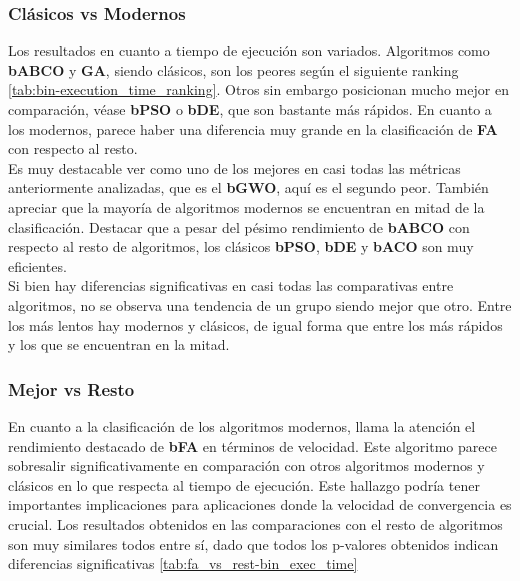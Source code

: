 \subsubsection{Clásicos vs Modernos}
Los resultados en cuanto a tiempo de ejecución son variados. Algoritmos como \textbf{bABCO} y \textbf{GA}, siendo clásicos, son los peores según el siguiente ranking \ref{tab:bin-execution_time_ranking}. Otros sin embargo posicionan mucho mejor en comparación, véase \textbf{bPSO} o \textbf{bDE}, que son bastante más rápidos. En cuanto a los modernos, parece haber una diferencia muy grande en la clasificación de \textbf{FA} con respecto al resto.\\[6pt]
Es muy destacable ver como uno de los mejores en casi todas las métricas anteriormente analizadas, que es el \textbf{bGWO}, aquí es el segundo peor. También apreciar que la mayoría de algoritmos modernos se encuentran en mitad de la clasificación. Destacar que a pesar del pésimo rendimiento de \textbf{bABCO} con respecto al resto de algoritmos, los clásicos \textbf{bPSO}, \textbf{bDE} y \textbf{bACO} son muy eficientes.\\[6pt]
Si bien hay diferencias significativas en casi todas las comparativas entre algoritmos, no se observa una tendencia de un grupo siendo mejor que otro. Entre los más lentos hay modernos y clásicos, de igual forma que entre los más rápidos y los que se encuentran en la mitad.

\subsubsection{Mejor vs Resto}
En cuanto a la clasificación de los algoritmos modernos, llama la atención el rendimiento destacado de \textbf{bFA} en términos de velocidad. Este algoritmo parece sobresalir significativamente en comparación con otros algoritmos modernos y clásicos en lo que respecta al tiempo de ejecución. Este hallazgo podría tener importantes implicaciones para aplicaciones donde la velocidad de convergencia es crucial. Los resultados obtenidos en las comparaciones con el resto de algoritmos son muy similares todos entre sí, dado que todos los p-valores obtenidos indican diferencias significativas \ref{tab:fa_vs_rest-bin_exec_time}

